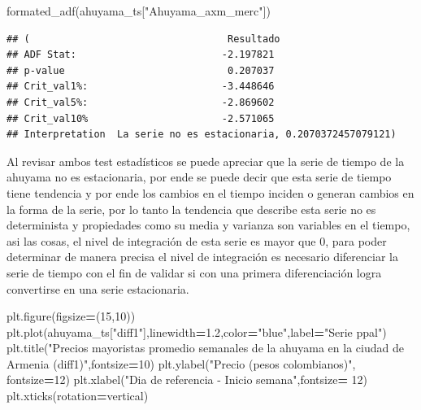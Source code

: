\documentclass[
]{book}
\newenvironment{Shaded}{\begin{snugshade}}{\end{snugshade}}
\newcommand{\DecValTok}[1]{\textcolor[rgb]{0.00,0.00,0.81}{#1}}
\newcommand{\FloatTok}[1]{\textcolor[rgb]{0.00,0.00,0.81}{#1}}
\newcommand{\NormalTok}[1]{#1}
\newcommand{\OperatorTok}[1]{\textcolor[rgb]{0.81,0.36,0.00}{\textbf{#1}}}
\newcommand{\StringTok}[1]{\textcolor[rgb]{0.31,0.60,0.02}{#1}}
\begin{document}
\begin{Shaded}
\begin{Highlighting}[]
\NormalTok{formated\_adf(ahuyama\_ts[}\StringTok{"Ahuyama\_axm\_merc"}\NormalTok{])}
\end{Highlighting}
\end{Shaded}

\begin{verbatim}
## (                                  Resultado
## ADF Stat:                         -2.197821
## p-value                            0.207037
## Crit_val1%:                       -3.448646
## Crit_val5%:                       -2.869602
## Crit_val10%                       -2.571065
## Interpretation  La serie no es estacionaria, 0.2070372457079121)
\end{verbatim}

Al revisar ambos test estadísticos se puede apreciar que la serie de tiempo de la ahuyama no es estacionaria, por ende se puede decir que esta serie de tiempo tiene tendencia y por ende los cambios en el tiempo inciden o generan cambios en la forma de la serie, por lo tanto la tendencia que describe esta serie no es determinista y propiedades como su media y varianza son variables en el tiempo, asi las cosas, el nivel de integración de esta serie es mayor que 0, para poder determinar de manera precisa el nivel de integración es necesario diferenciar la serie de tiempo con el fin de validar si con una primera diferenciación logra convertirse en una serie estacionaria.

\begin{Shaded}
\begin{Highlighting}[]

\NormalTok{plt.figure(figsize}\OperatorTok{=}\NormalTok{(}\DecValTok{15}\NormalTok{,}\DecValTok{10}\NormalTok{))}
\NormalTok{plt.plot(ahuyama\_ts[}\StringTok{"diff1"}\NormalTok{],linewidth}\OperatorTok{=}\FloatTok{1.2}\NormalTok{,color}\OperatorTok{=}\StringTok{"blue"}\NormalTok{,label}\OperatorTok{=}\StringTok{"Serie ppal"}\NormalTok{)}
\NormalTok{plt.title(}\StringTok{"Precios mayoristas promedio semanales de la ahuyama en la ciudad de Armenia (diff1)"}\NormalTok{,fontsize}\OperatorTok{=}\DecValTok{10}\NormalTok{)}
\NormalTok{plt.ylabel(}\StringTok{"Precio (pesos colombianos)"}\NormalTok{, fontsize}\OperatorTok{=}\DecValTok{12}\NormalTok{)}
\NormalTok{plt.xlabel(}\StringTok{"Dia de referencia {-} Inicio semana"}\NormalTok{,fontsize}\OperatorTok{=} \DecValTok{12}\NormalTok{)}
\NormalTok{plt.xticks(rotation}\OperatorTok{=}\StringTok{\textquotesingle{}vertical\textquotesingle{}}\NormalTok{)}
\end{Highlighting}
\end{Shaded}
\end{document}
